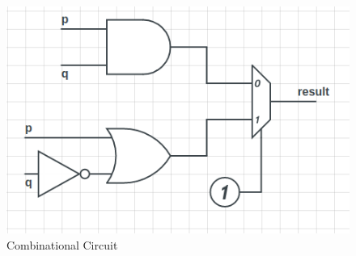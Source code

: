 \documentclass[a4 paper]{article}
\numberwithin{equation}{section}
\newcommand{\0}{\mathbf{0}}
\begin{document}
\begin{figure}[htp]
	\centering
	\includegraphics[scale=0.5]{circuit.png}
	\caption{Combinational Circuit}
	\label{fig: circuit}
	
\end{figure}
\end{document}
